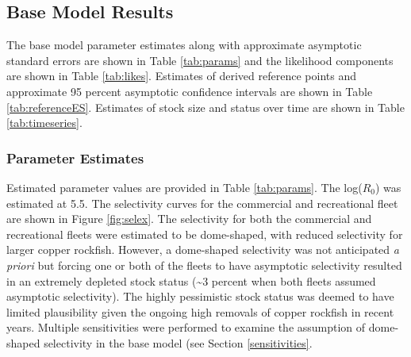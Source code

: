 \documentclass[11pt,
  english,
  a4paper,
]{article}
\begin{document}

\hypertarget{base-model-results}{%
\subsection{Base Model Results}\label{base-model-results}}

\leavevmode\tagmcend\tagstructend


The base model parameter estimates along with approximate asymptotic standard errors are shown in Table \ref{tab:params} and the likelihood components are shown in Table \ref{tab:likes}. Estimates of derived reference points and approximate 95 percent asymptotic confidence intervals are shown in Table \ref{tab:referenceES}. Estimates of stock size and status over time are shown in Table \ref{tab:timeseries}.

\leavevmode\tagmcend\tagstructend\par


\hypertarget{parameter-estimates}{%
\subsubsection{Parameter Estimates}\label{parameter-estimates}}

\leavevmode\tagmcend\tagstructend


Estimated parameter values are provided in Table \ref{tab:params}. The log({\(R_0\)\leavevmode\tagmcend\tagstructend}) was estimated at 5.5. The selectivity curves for the commercial and recreational fleet are shown in Figure \ref{fig:selex}. The selectivity for both the commercial and recreational fleets were estimated to be dome-shaped, with reduced selectivity for larger copper rockfish. However, a dome-shaped selectivity was not anticipated \emph{a priori} but forcing one or both of the fleets to have asymptotic selectivity resulted in an extremely depleted stock status (\textasciitilde3 percent when both fleets assumed asymptotic selectivity). The highly pessimistic stock status was deemed to have limited plausibility given the ongoing high removals of copper rockfish in recent years. Multiple sensitivities were performed to examine the assumption of dome-shaped selectivity in the base model (see Section \ref{sensitivities}.
\end{document}
